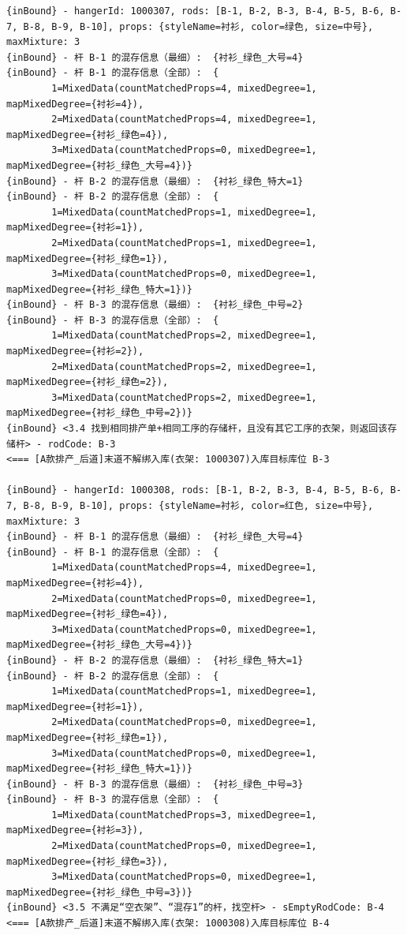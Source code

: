 {\begin{verbatim}
{inBound} - hangerId: 1000307, rods: [B-1, B-2, B-3, B-4, B-5, B-6, B-7, B-8, B-9, B-10], props: {styleName=衬衫, color=绿色, size=中号}, maxMixture: 3
{inBound} - 杆 B-1 的混存信息（最细）:  {衬衫_绿色_大号=4}
{inBound} - 杆 B-1 的混存信息（全部）:  {
		1=MixedData(countMatchedProps=4, mixedDegree=1, mapMixedDegree={衬衫=4}), 
		2=MixedData(countMatchedProps=4, mixedDegree=1, mapMixedDegree={衬衫_绿色=4}), 
		3=MixedData(countMatchedProps=0, mixedDegree=1, mapMixedDegree={衬衫_绿色_大号=4})}
{inBound} - 杆 B-2 的混存信息（最细）:  {衬衫_绿色_特大=1}
{inBound} - 杆 B-2 的混存信息（全部）:  {
		1=MixedData(countMatchedProps=1, mixedDegree=1, mapMixedDegree={衬衫=1}), 
		2=MixedData(countMatchedProps=1, mixedDegree=1, mapMixedDegree={衬衫_绿色=1}), 
		3=MixedData(countMatchedProps=0, mixedDegree=1, mapMixedDegree={衬衫_绿色_特大=1})}
{inBound} - 杆 B-3 的混存信息（最细）:  {衬衫_绿色_中号=2}
{inBound} - 杆 B-3 的混存信息（全部）:  {
		1=MixedData(countMatchedProps=2, mixedDegree=1, mapMixedDegree={衬衫=2}), 
		2=MixedData(countMatchedProps=2, mixedDegree=1, mapMixedDegree={衬衫_绿色=2}), 
		3=MixedData(countMatchedProps=2, mixedDegree=1, mapMixedDegree={衬衫_绿色_中号=2})}
{inBound} <3.4 找到相同排产单+相同工序的存储杆，且没有其它工序的衣架，则返回该存储杆> - rodCode: B-3
<=== [A款排产_后道]末道不解绑入库(衣架: 1000307)入库目标库位 B-3

{inBound} - hangerId: 1000308, rods: [B-1, B-2, B-3, B-4, B-5, B-6, B-7, B-8, B-9, B-10], props: {styleName=衬衫, color=红色, size=中号}, maxMixture: 3
{inBound} - 杆 B-1 的混存信息（最细）:  {衬衫_绿色_大号=4}
{inBound} - 杆 B-1 的混存信息（全部）:  {
		1=MixedData(countMatchedProps=4, mixedDegree=1, mapMixedDegree={衬衫=4}), 
		2=MixedData(countMatchedProps=0, mixedDegree=1, mapMixedDegree={衬衫_绿色=4}), 
		3=MixedData(countMatchedProps=0, mixedDegree=1, mapMixedDegree={衬衫_绿色_大号=4})}
{inBound} - 杆 B-2 的混存信息（最细）:  {衬衫_绿色_特大=1}
{inBound} - 杆 B-2 的混存信息（全部）:  {
		1=MixedData(countMatchedProps=1, mixedDegree=1, mapMixedDegree={衬衫=1}), 
		2=MixedData(countMatchedProps=0, mixedDegree=1, mapMixedDegree={衬衫_绿色=1}), 
		3=MixedData(countMatchedProps=0, mixedDegree=1, mapMixedDegree={衬衫_绿色_特大=1})}
{inBound} - 杆 B-3 的混存信息（最细）:  {衬衫_绿色_中号=3}
{inBound} - 杆 B-3 的混存信息（全部）:  {
		1=MixedData(countMatchedProps=3, mixedDegree=1, mapMixedDegree={衬衫=3}), 
		2=MixedData(countMatchedProps=0, mixedDegree=1, mapMixedDegree={衬衫_绿色=3}), 
		3=MixedData(countMatchedProps=0, mixedDegree=1, mapMixedDegree={衬衫_绿色_中号=3})}
{inBound} <3.5 不满足“空衣架”、“混存1”的杆，找空杆> - sEmptyRodCode: B-4
<=== [A款排产_后道]末道不解绑入库(衣架: 1000308)入库目标库位 B-4


\end{verbatim}}
